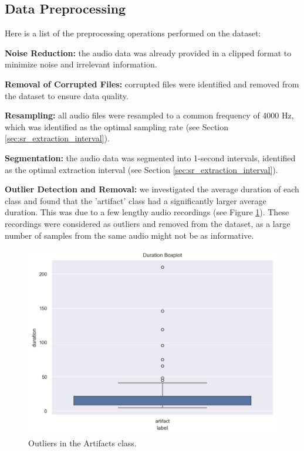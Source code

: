 \subsection{Data Preprocessing}
Here is a list of the preprocessing operations performed on the dataset:

\vspace{0.3cm}\noindent
\textbf{Noise Reduction:} the audio data was already provided in a clipped format 
to minimize noise and irrelevant information.

\vspace{0.3cm}\noindent
\textbf{Removal of Corrupted Files:} corrupted files were identified and removed 
from the dataset to ensure data quality.

\vspace{0.3cm}\noindent
\textbf{Resampling:} all audio files were resampled to a common frequency of 4000 Hz, 
which was identified as the optimal sampling rate (see Section \ref{sec:sr_extraction_interval}).

\vspace{0.3cm}\noindent
\textbf{Segmentation:} the audio data was segmented into 1-second intervals, 
identified as the optimal extraction interval (see Section \ref{sec:sr_extraction_interval}).

\vspace{0.3cm}\noindent
\textbf{Outlier Detection and Removal:} we investigated the average duration of 
each class and found that the 'artifact' class had a significantly larger average 
duration. This was due to a few lengthy audio 
recordings (see Figure \ref{fig:DataExp_outliers_Artifacts}). These recordings were 
considered as outliers and removed from the dataset, as a large number of samples from 
the same audio might not be as informative.

\begin{figure}[H]
	\centering
	\includegraphics[width=1\columnwidth]{./images/DataExp_outliers_artifact.png}
	\caption{Outliers in the Artifacts class.}
	\label{fig:DataExp_outliers_Artifacts}
 \end{figure}